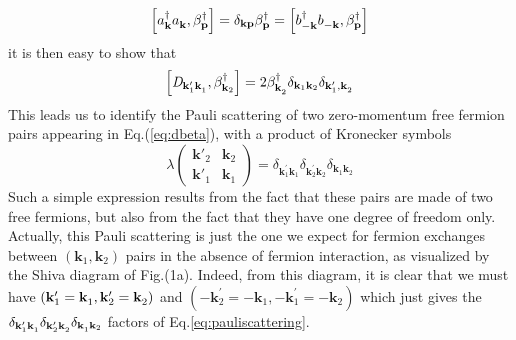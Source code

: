 \documentclass[aps,prb,superscriptaddress,showpacs,reprint,lengthcheck]{revtex4}
\newcommand{\vk}{\ensuremath{\mathbf{k}}}
\begin{document}
\begin{equation}  \label{eq:aBeta}
\left[a^{\dagger}_{\mathbf{k} }a^{}_{\mathbf{k} },\beta^{\dagger}_{\mathbf{p}
}\right]  =\delta_{\mathbf{k} \mathbf{p} }\beta^{\dagger}_{\mathbf{p} }=%
\left[b^{\dagger}_{-\mathbf{k} }b^{}_{-\mathbf{k} },\beta^{\dagger}_{\mathbf{%
p} }\right]  
\end{equation}
it is then easy to show that 
\begin{equation}  \label{eq:Dcom}
\left[\mathit{D} _{\mathbf{k} ^{\prime}_1\mathbf{k} ^{}_1},\beta^{\dagger}_{%
\mathbf{k} _2}\right]  =2\beta^{\dagger}_{\mathbf{k} ^{}_2}\delta_{\mathbf{k} _1%
\mathbf{k} _2}\delta_{\mathbf{k} ^{\prime}_1,\mathbf{k} ^{}_2}
\end{equation}
This leads us to identify the Pauli scattering of two zero-momentum free fermion pairs appearing in Eq.(\ref{eq:dbeta}), with a
product of Kronecker symbols 
\begin{equation}  \label{eq:pauliscattering}
\lambda\left(\begin{smallmatrix}\vk'_2&\vk_2\\\vk'_1&\vk_1\end{smallmatrix}%
\right)  =\delta_{\mathbf{k} ^{\prime}_1\mathbf{k} ^{}_1}\delta_{\mathbf{k}
^{\prime}_2\mathbf{k} ^{}_2}\delta_{\mathbf{k} ^{}_1\mathbf{k} ^{}_2}
\end{equation}
Such a simple expression results from the fact that these pairs are made of two free fermions, but also from the fact that they have one degree of freedom only.
Actually, this Pauli scattering is just the one we expect for fermion exchanges between $\left(\mathbf{k} _1,\mathbf{k} _2\right) $ pairs in the absence of fermion interaction,
as visualized by the Shiva diagram of Fig.(1a). Indeed, from this
diagram, it is clear that we must have $\left(\mathbf{k} ^{\prime}_1=\mathbf{%
k} ^{}_1,\mathbf{k} ^{\prime}_2=\mathbf{k} ^{}_2\right) $ and $\left(-\mathbf{k}
^{\prime}_2=-\mathbf{k} ^{}_1,-\mathbf{k} ^{\prime}_1=-\mathbf{k} ^{}_2\right) $ which just gives the $\delta_{\mathbf{k} ^{\prime}_1\mathbf{k} ^{}_1}\delta_{\mathbf{%
k} ^{\prime}_2\mathbf{k} ^{}_2}\delta_{\mathbf{k} ^{}_1\mathbf{k} _2}$
factors of Eq.\eqref{eq:pauliscattering}.
\end{document}
